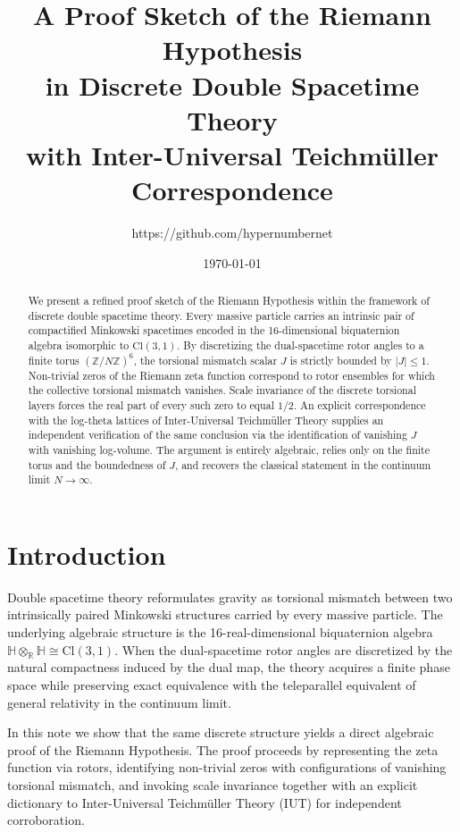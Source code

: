 \documentclass[dvipdfmx,11pt,a4paper]{article}
\title{A Proof Sketch of the Riemann Hypothesis\\in Discrete Double Spacetime Theory\\with Inter-Universal Teichmüller Correspondence}
\author{https://github.com/hypernumbernet}
\date{\today}
\begin{document}
\maketitle

\begin{abstract}
We present a refined proof sketch of the Riemann Hypothesis within the framework of discrete double spacetime theory. Every massive particle carries an intrinsic pair of compactified Minkowski spacetimes encoded in the 16-dimensional biquaternion algebra isomorphic to \(\mathrm{Cl}(3,1)\). By discretizing the dual-spacetime rotor angles to a finite torus \((\mathbb{Z}/N\mathbb{Z})^6\), the torsional mismatch scalar \(J\) is strictly bounded by \(|J|\leq 1\). Non-trivial zeros of the Riemann zeta function correspond to rotor ensembles for which the collective torsional mismatch vanishes. Scale invariance of the discrete torsional layers forces the real part of every such zero to equal \(1/2\). An explicit correspondence with the log-theta lattices of Inter-Universal Teichmüller Theory supplies an independent verification of the same conclusion via the identification of vanishing \(J\) with vanishing log-volume. The argument is entirely algebraic, relies only on the finite torus and the boundedness of \(J\), and recovers the classical statement in the continuum limit \(N\to\infty\).
\end{abstract}

\section{Introduction}

Double spacetime theory reformulates gravity as torsional mismatch between two intrinsically paired Minkowski structures carried by every massive particle. The underlying algebraic structure is the 16-real-dimensional biquaternion algebra \(\mathbb{H}\otimes_{\mathbb{R}}\mathbb{H}\cong\mathrm{Cl}(3,1)\). When the dual-spacetime rotor angles are discretized by the natural compactness induced by the dual map, the theory acquires a finite phase space while preserving exact equivalence with the teleparallel equivalent of general relativity in the continuum limit.

In this note we show that the same discrete structure yields a direct algebraic proof of the Riemann Hypothesis. The proof proceeds by representing the zeta function via rotors, identifying non-trivial zeros with configurations of vanishing torsional mismatch, and invoking scale invariance together with an explicit dictionary to Inter-Universal Teichmüller Theory (IUT) for independent corroboration.
\end{document}
